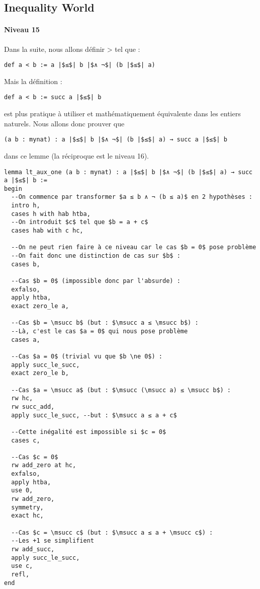 \subsection{Inequality World}

\paragraph{Niveau 15}

Dans la suite, nous allons définir > tel que :
\begin{verbatim}
def a < b := a |$≤$| b |$∧ ¬$| (b |$≤$| a)
\end{verbatim}
Mais la définition :
\begin{verbatim}
def a < b := succ a |$≤$| b
\end{verbatim}
est plus pratique à utiliser et mathématiquement équivalente dans les entiers naturels.
Nous allons donc prouver que 
\begin{verbatim}
(a b : mynat) : a |$≤$| b |$∧ ¬$| (b |$≤$| a) → succ a |$≤$| b
\end{verbatim}
dans ce lemme (la réciproque est le niveau 16).

\begin{verbatim}
lemma lt_aux_one (a b : mynat) : a |$≤$| b |$∧ ¬$| (b |$≤$| a) → succ a |$≤$| b :=
begin
  --On commence par transformer $a ≤ b ∧ ¬ (b ≤ a)$ en 2 hypothèses :
  intro h,
  cases h with hab htba,
  --On introduit $c$ tel que $b = a + c$
  cases hab with c hc,

  --On ne peut rien faire à ce niveau car le cas $b = 0$ pose problème
  --On fait donc une distinction de cas sur $b$ :
  cases b,

  --Cas $b = 0$ (impossible donc par l'absurde) :
  exfalso,
  apply htba,
  exact zero_le a,

  --Cas $b = \msucc b$ (but : $\msucc a ≤ \msucc b$) :
  --Là, c'est le cas $a = 0$ qui nous pose problème
  cases a,

  --Cas $a = 0$ (trivial vu que $b \ne 0$) :
  apply succ_le_succ,
  exact zero_le b,

  --Cas $a = \msucc a$ (but : $\msucc (\msucc a) ≤ \msucc b$) :
  rw hc,
  rw succ_add,
  apply succ_le_succ, --but : $\msucc a ≤ a + c$
  
  --Cette inégalité est impossible si $c = 0$
  cases c,

  --Cas $c = 0$
  rw add_zero at hc,
  exfalso,
  apply htba,
  use 0,
  rw add_zero,
  symmetry,
  exact hc,

  --Cas $c = \msucc c$ (but : $\msucc a ≤ a + \msucc c$) :
  --Les +1 se simplifient
  rw add_succ,
  apply succ_le_succ,
  use c,
  refl,
end
\end{verbatim}
